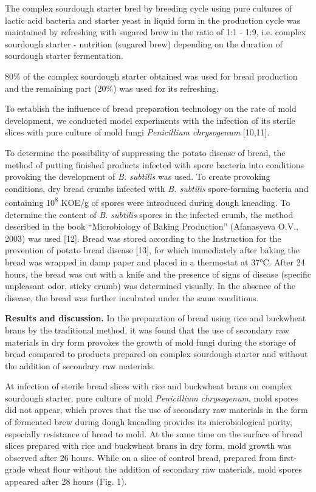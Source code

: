 \begin{multicols}{2}
The complex sourdough starter bred by breeding cycle using pure cultures
of lactic acid bacteria and starter yeast in liquid form in the
production cycle was maintained by refreshing with sugared brew in the
ratio of 1:1 - 1:9, i.e. complex sourdough starter - nutrition (sugared
brew) depending on the duration of sourdough starter fermentation.

80\% of the complex sourdough starter obtained was used for bread
production and the remaining part (20\%) was used for its refreshing.

To establish the influence of bread preparation technology on the rate
of mold development, we conducted model experiments with the infection
of its sterile slices with pure culture of mold fungi \emph{Penicillium
chrysogenum} {[}10,11{]}.

To determine the possibility of suppressing the potato disease of bread,
the method of putting finished products infected with spore bacteria
into conditions provoking the development of \emph{B. subtilis} was
used. To create provoking conditions, dry bread crumbs infected with
\emph{B. subtilis} spore-forming bacteria and containing
10\textsuperscript{8} KOE/g of spores were introduced during dough
kneading. To determine the content of \emph{B. subtilis} spores in the
infected crumb, the method described in the book ``Microbiology of
Baking Production'' (Afanasyeva O.V., 2003) was used {[}12{]}. Bread was
stored according to the Instruction for the prevention of potato bread
disease {[}13{]}, for which immediately after baking the bread was
wrapped in damp paper and placed in a thermostat at 37°C. After 24
hours, the bread was cut with a knife and the presence of signs of
disease (specific unpleasant odor, sticky crumb) was determined
visually. In the absence of the disease, the bread was further incubated
under the same conditions.

{\bfseries Results and discussion.} In the preparation of bread using rice
and buckwheat brans by the traditional method, it was found that the use
of secondary raw materials in dry form provokes the growth of mold fungi
during the storage of bread compared to products prepared on complex
sourdough starter and without the addition of secondary raw materials.

At infection of sterile bread slices with rice and buckwheat brans on
complex sourdough starter, pure culture of mold \emph{Penicillium
chrysogenum}, mold spores did not appear, which proves that the use of
secondary raw materials in the form of fermented brew during dough
kneading provides its microbiological purity, especially resistance of
bread to mold. At the same time on the surface of bread slices prepared
with rice and buckwheat brans in dry form, mold growth was observed
after 26 hours. While on a slice of control bread, prepared from
first-grade wheat flour without the addition of secondary raw materials,
mold spores appeared after 28 hours (Fig. 1).
\end{multicols}

